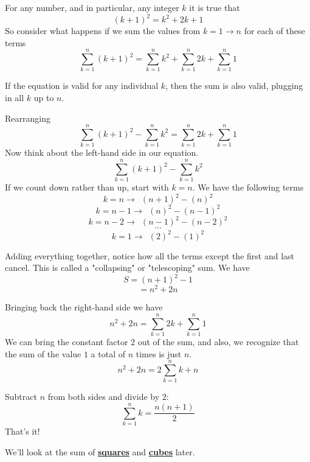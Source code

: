 \documentclass[11pt, oneside]{article}
\begin{document}
For any number, and in particular, any integer $k$ it is true that
\[ (k+1)^2 = k^2 + 2k + 1 \]
So consider what happens if we sum the values from $k=1 \rightarrow n$ for each of these terms
\[ \sum_{k=1}^n (k+1)^2 = \sum_{k=1}^n k^2 + \sum_{k=1}^n 2k + \sum_{k=1}^n 1 \]

If the equation is valid for any individual $k$, then the sum is also valid, plugging in all $k$ up to $n$.

Rearranging
\[ \sum_{k=1}^n (k+1)^2 - \sum_{k=1}^n k^2 = \sum_{k=1}^n 2k + \sum_{k=1}^n 1 \]
Now think about the left-hand side in our equation. 
\[ \sum_{k=1}^n (k+1)^2 - \sum_{k=1}^n k^2 \]
If we count down rather than up, start with $k=n$.  We have the following terms
\[ k = n \rightarrow \ \ (n+1)^2 - (n)^2 \]
\[ k = n-1 \rightarrow \ \ (n)^2 - (n-1)^2 \]
\[ k = n-2 \rightarrow \ \ (n-1)^2 - (n-2)^2 \]
\[ \cdots \]
\[ k = 1 \rightarrow \ \ (2)^2 - (1)^2 \]

Adding everything together, notice how all the terms except the first and last cancel.  This is called a "collapsing" or "telescoping" sum.  We have
\[ S = (n+1)^2 - 1 \]
\[ = n^2 + 2n \]

Bringing back the right-hand side  we have
\[ n^2 + 2n = \sum_{k=1}^n 2k + \sum_{k=1}^n 1 \]
We can bring the constant factor $2$ out of the sum, and also, we recognize that the sum of the value $1$ a total of $n$ times is just $n$.
\[ n^2 + 2n = 2\sum_{k=1}^n k + n \]

Subtract $n$ from both sides and divide by $2$:
\[ \sum_{k=1}^n k = \frac{n (n+1)}{2} \]
That's it!

We'll look at the sum of  \hyperref[sec:sum_of_squares]{\textbf{squares}} and \hyperref[sec:sum_of_cubes]{\textbf{cubes}} later.
\end{document}

